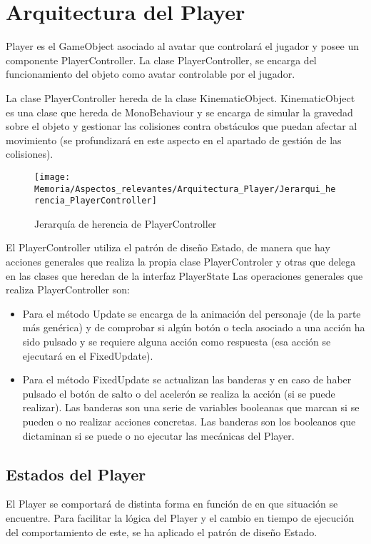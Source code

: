 
\section{Arquitectura del Player}
Player es el GameObject asociado al avatar que controlará el jugador y posee un componente PlayerController. La clase PlayerController, se encarga del funcionamiento del objeto como avatar controlable por el jugador.

La clase PlayerController hereda de la clase KinematicObject. KinematicObject es una clase que hereda de MonoBehaviour y se encarga de simular la gravedad sobre el objeto y gestionar las colisiones contra obstáculos que puedan afectar al movimiento (se profundizará en este aspecto en el apartado de gestión de las colisiones).

\clearpage
\begin{figure}[h]
\centering
\texttt{[image: Memoria/Aspectos\_relevantes/Arquitectura\_Player/Jerarqui\_herencia\_PlayerController]}
\caption{Jerarquía de herencia de PlayerController}
\end{figure}

El PlayerController utiliza el patrón de diseño Estado, de manera que hay acciones generales que realiza la propia clase PlayerControler y otras que delega en las clases que heredan de la interfaz PlayerState
Las operaciones generales que realiza PlayerController son:
\begin{itemize}
\item
Para el método Update se encarga de la animación del personaje (de la parte más genérica) y de comprobar si algún botón o tecla asociado a una acción ha sido pulsado y se requiere alguna acción como respuesta (esa acción se ejecutará en el FixedUpdate).
\item
Para el método FixedUpdate se actualizan las banderas y en caso de haber pulsado el botón de salto o del acelerón se realiza la acción (si se puede realizar). Las banderas son una serie de variables booleanas que marcan si se pueden o no realizar acciones concretas. Las banderas son los booleanos que dictaminan si se puede o no ejecutar las mecánicas del Player.
\end{itemize}

\subsection{Estados del Player}
El Player se comportará de distinta forma en función de en que situación se encuentre. Para facilitar la lógica del Player y el cambio en tiempo de ejecución del comportamiento de este, se ha aplicado el patrón de diseño Estado.


